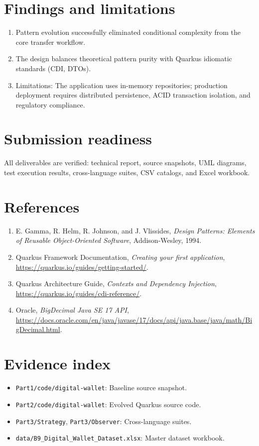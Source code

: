 \documentclass[11pt,a4paper]{article}
\begin{document}
\section{Findings and limitations}
\begin{enumerate}[noitemsep]
    \item Pattern evolution successfully eliminated conditional complexity from the core transfer workflow.
    \item The design balances theoretical pattern purity with Quarkus idiomatic standards (CDI, DTOs).
    \item Limitations: The application uses in-memory repositories; production deployment requires distributed persistence, ACID transaction isolation, and regulatory compliance.
\end{enumerate}

\section{Submission readiness}
All deliverables are verified: technical report, source snapshots, UML diagrams, test execution results, cross-language suites, CSV catalogs, and Excel workbook.

\section{References}
\begin{enumerate}[noitemsep]
    \item E. Gamma, R. Helm, R. Johnson, and J. Vlissides, \textit{Design Patterns: Elements of Reusable Object-Oriented Software}, Addison-Wesley, 1994.
    \item Quarkus Framework Documentation, \textit{Creating your first application}, \url{https://quarkus.io/guides/getting-started/}.
    \item Quarkus Architecture Guide, \textit{Contexts and Dependency Injection}, \url{https://quarkus.io/guides/cdi-reference/}.
    \item Oracle, \textit{BigDecimal Java SE 17 API}, \url{https://docs.oracle.com/en/java/javase/17/docs/api/java.base/java/math/BigDecimal.html}.
\end{enumerate}

\appendix
\section{Evidence index}
\begin{itemize}[noitemsep]
    \item \texttt{Part1/code/digital-wallet}: Baseline source snapshot.
    \item \texttt{Part2/code/digital-wallet}: Evolved Quarkus source code.
    \item \texttt{Part3/Strategy}, \texttt{Part3/Observer}: Cross-language suites.
    \item \texttt{data/B9_Digital_Wallet_Dataset.xlsx}: Master dataset workbook.
\end{itemize}
\end{document}
